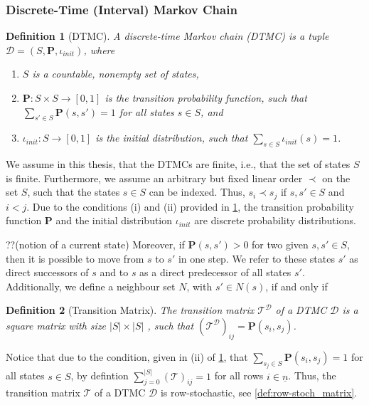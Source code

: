 \documentclass[journal,compsoc,10pt]{IEEEtran}
\newcommand{\MC}{\mathcal{D}} %
\newcommand{\tT}{\mathcal{T}} %
\newcommand{\PF}{\mathbf{P}} %
\newcommand{\tod}{\todo[color=red!40]} %
\newtheorem{definition}{Definition}[section]
\begin{document}
\subsubsection{Discrete-Time (Interval) Markov Chain}
\begin{definition}[DTMC]\label{def:DTMCs}
    A discrete-time Markov chain (DTMC) is a tuple $\MC = (S, \PF,\iota_{init})$, where
    \begin{enumerate}[label=(\roman*)]
        \item $S$ is a countable, nonempty set of states,
        \item $\PF: S \times S \rightarrow [0,1]$ is the transition probability function, such that $\sum_{s'\in S}\PF(s,s') = 1$ for all states $s \in S$, and
        \item $\iota_{init}: S \rightarrow [0,1]$ is the initial distribution, such that $\sum_{s\in S}\iota_{init}(s)=1$.
    \end{enumerate}
\end{definition}
We assume in this thesis, that the DTMCs are finite, i.e., that the set of states $S$ is finite. Furthermore, we assume an arbitrary but fixed linear order $\prec$ on the set $S$, such that the states $s\in S$ can be indexed. Thus, $s_i \prec s_j$ if $s,s' \in S$ and $i < j$.
Due to the conditions (i) and (ii) provided in \cref{def:DTMCs}, the transition probability function $\PF$ and the initial distribution $\iota_{init}$ are discrete probability distributions.

??(notion of a current state)
Moreover, if $\PF(s,s')>0$ for two given $s,s' \in S$, then it is possible to move from $s$ to $s'$ in one step. We refer to these states $s'$ as direct successors of $s$ and to $s$ as a direct predecessor of all states $s'$. Additionally, we define a neighbour set $N$, with $s' \in N(s)$, if and only if 

\begin{definition}[Transition Matrix]\label{def:transition_matrix}
    The transition matrix $\tT^{\MC}$ of a DTMC $\MC$ is a square matrix with size $|S| \times |S|$ \tod{gemeintes S klar?}, such that $(\tT^{\MC})_{ij} = \PF(s_i,s_j)$.
\end{definition}
Notice that due to the condition, given in (ii) of \cref{def:DTMCs}, that $\sum_{s_j\in S}\PF(s_i,s_j) = 1$ for all states $s \in S$, by defintion $\sum_{j=0}^{|S|}(\tT)_{ij} = 1$ for all rows $i \in \underline{n}$. Thus, the transition matrix $\tT$ of a DTMC $\MC$ is row-stochastic, see \cref{def:row-stoch_matrix}. 
\end{document}
